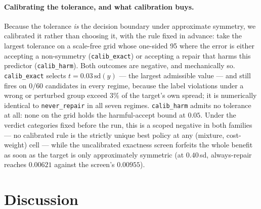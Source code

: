 \documentclass[11pt]{article}
\begin{document}
\paragraph{Calibrating the tolerance, and what calibration buys.}
Because the tolerance \emph{is} the decision boundary under approximate symmetry, we calibrated it
rather than choosing it, with the rule fixed in advance: take the largest tolerance on a scale-free
grid whose one-sided 95%
where the error is either accepting a non-symmetry (\texttt{calib\_exact}) or accepting a repair that
harms this predictor (\texttt{calib\_harm}). Both outcomes are negative, and mechanically so.
\texttt{calib\_exact} selects $t = 0.03\,\mathrm{sd}(y)$ --- the largest admissible value --- and
still fires on $0/60$ candidates in every regime, because the label violations under a wrong or
perturbed group exceed $3\%$ of the target's own spread; it is numerically identical to
\texttt{never\_repair} in all seven regimes. \texttt{calib\_harm} admits no tolerance at all: none on
the grid holds the harmful-accept bound at $0.05$. Under the verdict categories fixed before the run,
this is a scoped negative in both families --- no calibrated rule is the strictly unique best policy
at any (mixture, cost-weight) cell --- while the uncalibrated exactness screen forfeits the whole
benefit as soon as the target is only approximately symmetric (at $0.40$\,sd, always-repair reaches
$0.00621$ against the screen's $0.00955$).

\section{Discussion}
\label{sec:discussion}
\end{document}
